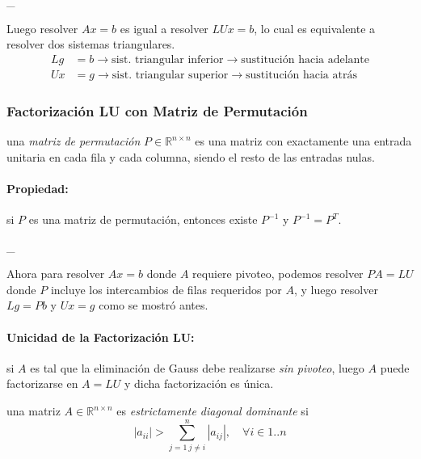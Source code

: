 \_

Luego resolver \(Ax = b\) es igual a resolver \(LUx = b\), lo cual es
equivalente a resolver dos sistemas triangulares. \begin{align*} 
Lg &= b \rightarrow
\text{sist. triangular inferior} \rightarrow
\text{sustitución hacia adelante} \\ 
Ux &= g \rightarrow 
\text{sist. triangular superior} \rightarrow
\text{sustitución hacia atrás}
\end{align*}

\hypertarget{factorizaciuxf3n-lu-con-matriz-de-permutaciuxf3n}{%
\subsubsection{Factorización LU con Matriz de
Permutación}\label{factorizaciuxf3n-lu-con-matriz-de-permutaciuxf3n}}

\Definicion una \emph{matriz de permutación}
\(P \in \ensuremath{\mathbb{R}}^{n \times n}\) es una matriz con
exactamente una entrada unitaria en cada fila y cada columna, siendo el
resto de las entradas nulas.

\hypertarget{propiedad}{%
\paragraph{Propiedad:}\label{propiedad}}

si \(P\) es una matriz de permutación, entonces existe \(P^{-1}\) y
\(P^{-1} = P^T\).

\_

Ahora para resolver \(Ax = b\) donde \(A\) requiere pivoteo, podemos
resolver \(PA = LU\) donde \(P\) incluye los intercambios de filas
requeridos por \(A\), y luego resolver \(Lg = Pb\) y \(Ux = g\) como se
mostró antes.

\hypertarget{unicidad-de-la-factorizaciuxf3n-lu}{%
\paragraph{Unicidad de la Factorización
LU:}\label{unicidad-de-la-factorizaciuxf3n-lu}}

si \(A\) es tal que la eliminación de Gauss debe realizarse \emph{sin
pivoteo}, luego \(A\) puede factorizarse en \(A = LU\) y dicha
factorización es única.

\Definicion una matriz \(A \in \ensuremath{\mathbb{R}}^{n \times n}\) es
\emph{estrictamente diagonal dominante} si \[
|a_{ii}| > \sum_{j=1\  j\neq i}^n  |a_{ij}|, \quad \forall i \in 1..n
\]

